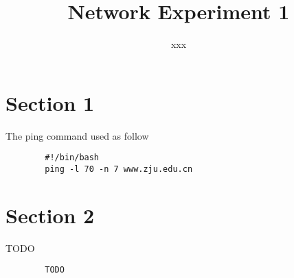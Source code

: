 \documentclass[UTF8]{article}
\title{Network Experiment 1}
\author{xxx}
\begin{document}
\maketitle

\section{Section 1}
The ping command used as follow
\begin{center}
    \begin{verbatim}
        #!/bin/bash
        ping -l 70 -n 7 www.zju.edu.cn
    \end{verbatim}
\end{center}

\section{Section 2}
TODO
\begin{center}
    \begin{verbatim}
        TODO
    \end{verbatim}
\end{center}
\end{document}
